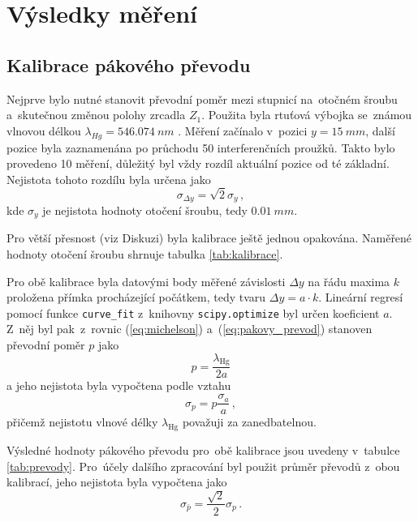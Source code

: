 \documentclass{../concepts/titul_protokol_p/prepareprotokol} %
\newcommand{\relative}[1]{
\frac{\sigma_{#1}}{#1}
}
\begin{document}
\section{Výsledky měření}

\subsection{Kalibrace pákového převodu}

Nejprve bylo nutné stanovit převodní poměr mezi stupnicí na~otočném šroubu a~skutečnou změnou
polohy zrcadla $Z_1$. Použita byla rtuťová výbojka se~známou vlnovou délkou $\lambda_{Hg} = \qty{546.074}{nm}$
\cite{nist}.
Měření začínalo v~pozici $y = \qty{15}{mm}$, další pozice byla zaznamenána po průchodu 50 interferenčních proužků.
Takto bylo provedeno 10 měření, důležitý byl vždy rozdíl aktuální pozice od té základní. Nejistota tohoto
rozdílu byla určena jako \cite{englich}
\begin{equation}\label{eq:sigmadeltay}
    \sigma_{\Delta y} = \sqrt{2} \sigma_y \, ,
\end{equation}
kde $\sigma_y$ je nejistota hodnoty otočení šroubu, tedy $\qty{0.01}{mm}$.

Pro větší přesnost (viz Diskuzi) byla kalibrace ještě jednou opakována.
Naměřené hodnoty otočení šroubu shrnuje tabulka \ref{tab:kalibrace}.

Pro obě kalibrace byla datovými body měřené závislosti $\Delta y$ na řádu maxima $k$ proložena
přímka procházející počátkem, tedy tvaru $\Delta y = a \cdot k$. Lineární regresí pomocí funkce
\texttt{curve\_fit} z~knihovny \texttt{scipy.optimize} byl určen koeficient $a$. Z~něj byl pak~z~rovnic
(\ref{eq:michelson}) a~(\ref{eq:pakovy_prevod}) stanoven převodní poměr $p$ jako
\begin{equation}\label{p}
    p = \frac{\lambda_\mathrm{Hg}}{2a}
\end{equation}
a jeho nejistota byla vypočtena podle vztahu
\begin{equation}
    \sigma_p = p \relative{a} \,,
    \label{eq:sigmap}
\end{equation}
přičemž nejistotu vlnové délky $\lambda_{\mathrm{Hg}}$ považuji za zanedbatelnou.

Výsledné hodnoty pákového převodu pro~obě kalibrace jsou uvedeny v~tabulce
\ref{tab:prevody}. Pro~účely dalšího zpracování byl použit průměr převodů z~obou kalibrací, jeho nejistota
byla vypočtena jako
\begin{equation}\label{eq:sigmapbar}
    \sigma_{\bar{p}} = \frac{\sqrt{2}}{2} \sigma_p \, .
\end{equation}
\end{document}
